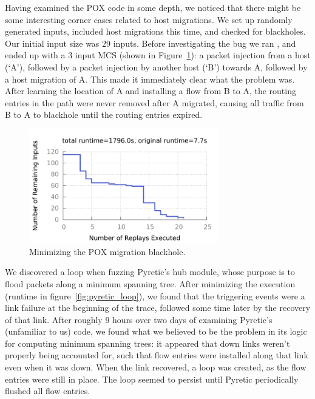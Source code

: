  Having
examined the POX code in some depth, we noticed that there might be
some interesting corner cases related to host migrations.
We set up randomly generated inputs, included host
migrations this time, and checked for blackholes. Our initial input size was
$29$ inputs.
Before investigating the bug we
ran \projectname, and ended up with a $3$ input MCS (shown
in Figure~\ref{fig:pox_migration}): a packet injection from a
host (`A'), followed
by a packet injection by another host (`B') towards A, followed by a host migration of A. This made it immediately
clear what the problem was. After learning the location of A and installing a
flow from B to A, the routing entries in the path were never removed after A
migrated, causing all traffic from B to A to blackhole until the routing
entries expired.

\begin{figure}[t]
    \includegraphics[width=3.25in]{../graphs/runtime/pox_migration_blackhole.pdf}
    \caption[]{\label{fig:pox_migration} Minimizing the POX migration
    blackhole.}
\end{figure}

 We discovered a loop when fuzzing Pyretic's hub
module, whose purpose is to flood packets along a minimum spanning tree. After
minimizing the execution (runtime in figure~\ref{fig:pyretic_loop}), we found that the triggering events
were a link failure at the beginning of the trace, followed some time later by
the recovery of that link. After roughly 9 hours over two days of examining
Pyretic's (unfamiliar to us) code, we found what we believed to be the problem
in its logic for computing minimum spanning trees: it appeared that down links
weren't properly being accounted for, such that flow entries were installed
along that link even when it was down. When the link recovered, a loop was
created, as the flow entries were still in place. The loop seemed to persist until
Pyretic periodically flushed all flow entries.

